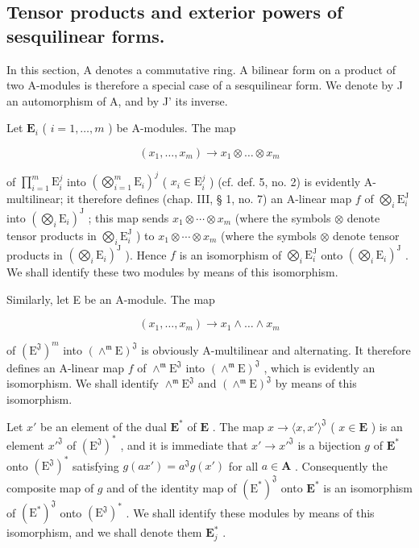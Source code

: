 \subsection{Tensor products and exterior powers of sesquilinear forms.}

In this section, A denotes a commutative ring. A bilinear form on a product of two A-modules is therefore a special case of a sesquilinear form. We denote by J an automorphism of A, and by J' its inverse.

Let \(\mathbf{E}_i\) ( \(i = 1, \ldots, m\) ) be A-modules. The map

\[
(x _ {1}, \dots , x _ {m}) \rightarrow x _ {1} \otimes \dots \otimes x _ {m}
\]

of \(\prod_{i=1}^{m}\mathrm{E}_{i}^{j}\) into \((\bigotimes_{i=1}^{m}\mathrm{E}_{i})^{j}\) ( \(x_{i}\in\mathrm{E}_{i}^{j}\) ) (cf. def. 5, no. 2) is evidently A-multilinear; it therefore defines (chap. III, § 1, no. 7) an A-linear map \(f\) of \(\bigotimes_{i}\mathrm{E}_{i}^{\mathrm{J}}\) into \((\bigotimes_{i}\mathrm{E}_{i})^{\mathrm{J}}\) ; this map sends \(x_{1}\otimes\cdots\otimes x_{m}\) (where the symbols \(\otimes\) denote tensor products in \(\bigotimes_{i}\mathrm{E}_{i}^{\mathrm{J}}\) ) to \(x_{1}\otimes\cdots\otimes x_{m}\) (where the symbols \(\otimes\) denote tensor products in \((\bigotimes_{i}\mathrm{E}_{i})^{\mathrm{J}}\) ). Hence \(f\) is an isomorphism of \(\bigotimes_{i}\mathrm{E}_{i}^{\mathrm{J}}\) onto \((\bigotimes_{i}\mathrm{E}_{i})^{\mathrm{J}}\) . We shall identify these two modules by means of this isomorphism.

Similarly, let E be an A-module. The map

\[
(x _ {1}, \dots , x _ {m}) \rightarrow x _ {1} \wedge \dots \wedge x _ {m}
\]

of \((\mathrm{E}^{\mathfrak{J}})^{m}\) into \((\wedge^{\mathfrak{m}}\mathrm{E})^{\mathfrak{J}}\) is obviously A-multilinear and alternating. It therefore defines an A-linear map \(f\) of \(\wedge^{\mathfrak{m}}\mathrm{E}^{\mathfrak{J}}\) into \((\wedge^{\mathfrak{m}}\mathrm{E})^{\mathfrak{J}}\) , which is evidently an isomorphism. We shall identify \(\wedge^{\mathfrak{m}}\mathrm{E}^{\mathfrak{J}}\) and \((\wedge^{\mathfrak{m}}\mathrm{E})^{\mathfrak{J}}\) by means of this isomorphism.

Let \(x'\) be an element of the dual \(\mathbf{E}^*\) of \(\mathbf{E}\) . The map \(x \to \langle x, x' \rangle^{\mathfrak{J}}\) ( \(x \in \mathbf{E}\) ) is an element \(x'^{\mathfrak{J}}\) of \((\mathrm{E}^{\mathfrak{J}})^*\) , and it is immediate that \(x' \to x'^{\mathfrak{J}}\) is a bijection \(g\) of \(\mathbf{E}^*\) onto \((\mathrm{E}^{\mathfrak{J}})^*\) satisfying \(g(ax') = a^{\mathfrak{J}}g(x')\) for all \(a \in \mathbf{A}\) . Consequently the composite map of \(g\) and of the identity map of \((\mathrm{E}^*)^{\mathfrak{J}}\) onto \(\mathbf{E}^*\) is an isomorphism of \((\mathrm{E}^*)^{\mathfrak{J}}\) onto \((\mathrm{E}^{\mathfrak{J}})^*\) . We shall identify these modules by means of this isomorphism, and we shall denote them \(\mathbf{E}_j^*\) .

